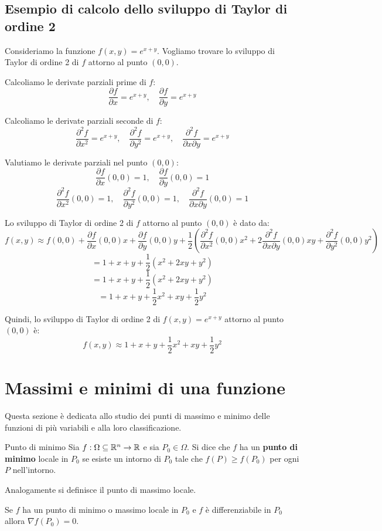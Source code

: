 \subsection{Esempio di calcolo dello sviluppo di Taylor di ordine 2}
Consideriamo la funzione $f(x,y) = e^{x+y}$. Vogliamo trovare lo sviluppo di Taylor di ordine 2 di $f$ attorno al punto $(0,0)$.

Calcoliamo le derivate parziali prime di $f$:
\[
\frac{\partial f}{\partial x} = e^{x+y}, \quad \frac{\partial f}{\partial y} = e^{x+y}
\]

Calcoliamo le derivate parziali seconde di $f$:
\[
\frac{\partial^2 f}{\partial x^2} = e^{x+y}, \quad \frac{\partial^2 f}{\partial y^2} = e^{x+y}, \quad \frac{\partial^2 f}{\partial x \partial y} = e^{x+y}
\]

Valutiamo le derivate parziali nel punto $(0,0)$:
\[
\frac{\partial f}{\partial x}(0,0) = 1, \quad \frac{\partial f}{\partial y}(0,0) = 1
\]
\[
\frac{\partial^2 f}{\partial x^2}(0,0) = 1, \quad \frac{\partial^2 f}{\partial y^2}(0,0) = 1, \quad \frac{\partial^2 f}{\partial x \partial y}(0,0) = 1
\]

Lo sviluppo di Taylor di ordine 2 di $f$ attorno al punto $(0,0)$ è dato da:
\[
f(x,y) \approx f(0,0) + \frac{\partial f}{\partial x}(0,0)x + \frac{\partial f}{\partial y}(0,0)y + \frac{1}{2}\left( \frac{\partial^2 f}{\partial x^2}(0,0)x^2 + 2\frac{\partial^2 f}{\partial x \partial y}(0,0)xy + \frac{\partial^2 f}{\partial y^2}(0,0)y^2 \right)
\]
\[
= 1 + x + y + \frac{1}{2}(x^2 + 2xy + y^2)
\]
\[
= 1 + x + y + \frac{1}{2}(x^2 + 2xy + y^2)
\]
\[
= 1 + x + y + \frac{1}{2}x^2 + xy + \frac{1}{2}y^2
\]

Quindi, lo sviluppo di Taylor di ordine 2 di $f(x,y) = e^{x+y}$ attorno al punto $(0,0)$ è:
\[
f(x,y) \approx 1 + x + y + \frac{1}{2}x^2 + xy + \frac{1}{2}y^2
\]

\section{Massimi e minimi di una funzione}

Questa sezione è dedicata allo studio dei punti di massimo e minimo delle funzioni di più variabili e alla loro classificazione.

\begin{definizione}{Punto di minimo}
  Sia $f:\Omega \subseteq \mathbb{R}^n \rightarrow \mathbb{R}$ e sia $P_0 \in \Omega$. Si dice che $f$ ha un \textbf{punto di minimo} locale in $P_0$ se esiste un intorno di $P_0$ tale che $f(P) \geq f(P_0)$ per ogni $P$ nell'intorno.
\end{definizione}
Analogamente si definisce il punto di massimo locale.
\begin{teorema}{}
  Se $f$ ha un punto di minimo o massimo locale in $P_0$ e $f$ è differenziabile in $P_0$ allora $\nabla f(P_0) = 0$.
\end{teorema}


